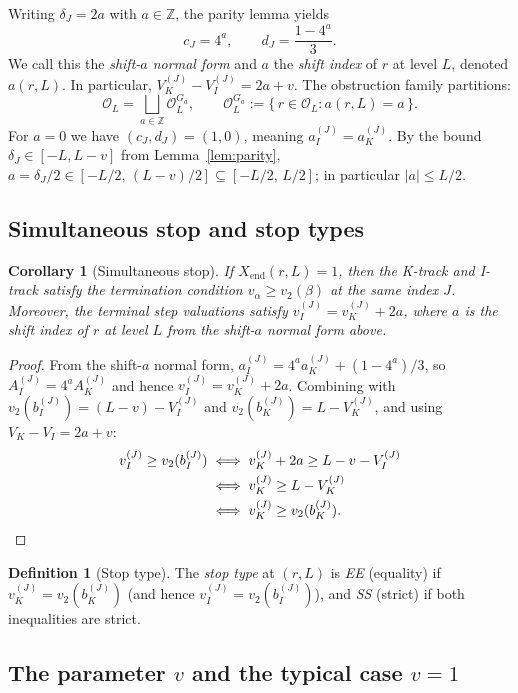 \documentclass[11pt,reqno]{amsart}
\theoremstyle{plain}
\newtheorem{corollary}[theorem]{Corollary}
\theoremstyle{definition}
\newtheorem{definition}[theorem]{Definition}
\theoremstyle{remark}
\newcommand{\Z}{\mathbb{Z}}
\newcommand{\Obs}{\mathcal{O}}
\newcommand{\Xend}{X_{\mathrm{end}}}
\newcommand{\Vk}{V_{K}}
\newcommand{\Vi}{V_{I}}
\newcommand{\vk}{v_{K}}
\newcommand{\vi}{v_{I}}
\newcommand{\vtwo}{v_{2}}
\begin{document}
Writing $\delta_J = 2a$ with $a \in \Z$, the parity lemma yields
\[
c_J = 4^a, \qquad d_J = \frac{1 - 4^a}{3}.
\]
We call this the \emph{shift-$a$ normal form} and $a$ the \emph{shift index}
of $r$ at level $L$, denoted $a(r, L)$. In particular,
$\Vk^{(J)} - \Vi^{(J)} = 2a + v$. The obstruction family partitions:
\[
\Obs_L = \bigsqcup_{a \in \Z} \Obs_L^{G_a}, \qquad \Obs_L^{G_a} := \{\, r \in \Obs_L : a(r, L) = a \,\}.
\]
For $a = 0$ we have $(c_J, d_J) = (1, 0)$, meaning $a_I^{(J)} = a_K^{(J)}$.
By the bound $\delta_J \in [-L, L - v]$ from Lemma~\ref{lem:parity},
$a = \delta_J/2 \in [-L/2,\, (L - v)/2] \subseteq [-L/2,\, L/2]$;
in particular $|a| \le L/2$.

\subsection{Simultaneous stop and stop types}

\begin{corollary}[Simultaneous stop]
\label{cor:sync}
If $\Xend(r, L) = 1$, then the K-track and I-track satisfy the termination
condition $v_\alpha \ge \vtwo(\beta)$ at the same index $J$. Moreover, the
terminal step valuations satisfy $\vi^{(J)} = \vk^{(J)} + 2a$, where $a$
is the shift index of $r$ at level $L$ from the shift-$a$ normal form above.
\end{corollary}

\begin{proof}
From the shift-$a$ normal form, $a_I^{(J)} = 4^a a_K^{(J)} + (1-4^a)/3$, so
$A_I^{(J)} = 4^a A_K^{(J)}$ and hence $\vi^{(J)} = \vk^{(J)} + 2a$.
Combining with $\vtwo(b_I^{(J)}) = (L-v) - \Vi^{(J)}$ and
$\vtwo(b_K^{(J)}) = L - \Vk^{(J)}$, and using $\Vk - \Vi = 2a + v$:
\begin{align*}
\vi^{(J)} \ge \vtwo(b_I^{(J)})
  &\iff \vk^{(J)} + 2a \ge L - v - \Vi^{(J)} \\
  &\iff \vk^{(J)} \ge L - \Vk^{(J)} \\
  &\iff \vk^{(J)} \ge \vtwo(b_K^{(J)}). \qedhere
\end{align*}
\end{proof}

\begin{definition}[Stop type]\label{def:stop-type}
The \emph{stop type} at $(r, L)$ is \emph{EE} (equality) if
$\vk^{(J)} = \vtwo(b_K^{(J)})$ (and hence $\vi^{(J)} = \vtwo(b_I^{(J)})$),
and \emph{SS} (strict) if both inequalities are strict.
\end{definition}

\subsection{The parameter \texorpdfstring{$v$}{v} and the typical case \texorpdfstring{$v = 1$}{v = 1}}
\end{document}
